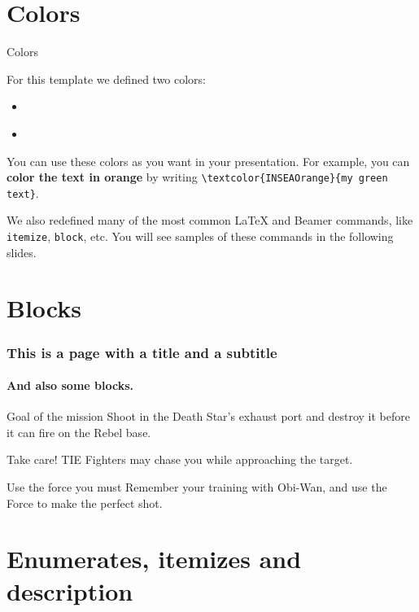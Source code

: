 \documentclass[usenames,dvipsnames,10pt,aspectratio=169]{beamer}
\begin{document}
\section{Colors}

\begin{frame}{Colors}

For this template we defined two colors:
\begin{itemize}
\item \textcolor{white}{}
\item \textcolor{white}{}
\end{itemize}

\vskip 0.5cm

You can use these colors as you want in your presentation. For example, you can \textbf{\textcolor{INSEAOrange}{color the text in orange}} by writing \texttt{\textbackslash textcolor\{INSEAOrange\}\{my green text\}}.

\vskip 0.5cm

We also redefined many of the most common \LaTeX{} and Beamer commands, like \texttt{itemize}, \texttt{block}, etc. You will see samples of these commands in the following slides.

\end{frame}

\section{Blocks}

\begin{frame} 
\frametitle{This is a page with a title and a subtitle} 
\framesubtitle{And also some blocks.} 
\begin{block}{Goal of the mission}
Shoot in the Death Star's exhaust port and destroy it before it can fire on the Rebel base.
\end{block} 
\begin{alertblock}{Take care!}
TIE Fighters may chase you while approaching the target.
\end{alertblock} 
\begin{exampleblock}{Use the force you must}
Remember your training with Obi-Wan, and use the Force to make the perfect shot.
\end{exampleblock} 

\end{frame}

\section{Enumerates, itemizes and description}
\end{document}
